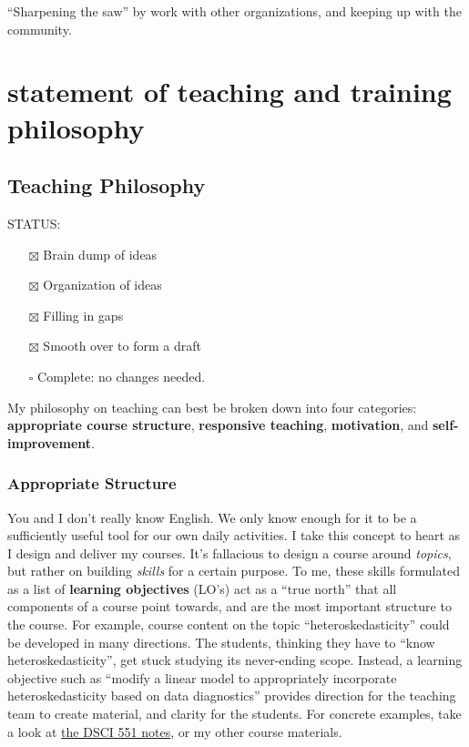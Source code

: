 \documentclass[]{article}
\providecommand{\tightlist}{%
  \setlength{\itemsep}{0pt}\setlength{\parskip}{0pt}}
\begin{document}
``Sharpening the saw'' by work with other organizations, and keeping up with the community.

\hypertarget{statement-of-teaching-and-training-philosophy}{%
\section{statement of teaching and training philosophy}\label{statement-of-teaching-and-training-philosophy}}

\hypertarget{teaching-philosophy}{%
\subsection{Teaching Philosophy}\label{teaching-philosophy}}

STATUS:

\begin{itemize}
\tightlist
\item[$\boxtimes$]
  Brain dump of ideas
\item[$\boxtimes$]
  Organization of ideas
\item[$\boxtimes$]
  Filling in gaps
\item[$\boxtimes$]
  Smooth over to form a draft
\item[$\square$]
  Complete: no changes needed.
\end{itemize}

My philosophy on teaching can best be broken down into four categories: \textbf{appropriate course structure}, \textbf{responsive teaching}, \textbf{motivation}, and \textbf{self-improvement}.

\hypertarget{appropriate-structure}{%
\subsubsection{Appropriate Structure}\label{appropriate-structure}}

You and I don't really know English. We only know enough for it to be a sufficiently useful tool for our own daily activities. I take this concept to heart as I design and deliver my courses. It's fallacious to design a course around \emph{topics}, but rather on building \emph{skills} for a certain purpose. To me, these skills formulated as a list of \textbf{learning objectives} (LO's) act as a ``true north'' that all components of a course point towards, and are the most important structure to the course. For example, course content on the topic ``heteroskedasticity'' could be developed in many directions. The students, thinking they have to ``know heteroskedasticity'', get stuck studying its never-ending scope. Instead, a learning objective such as ``modify a linear model to appropriately incorporate heteroskedasticity based on data diagnostics'' provides direction for the teaching team to create material, and clarity for the students. For concrete examples, take a look at \href{https://ubc-mds.github.io/DSCI_551_stat-prob-dsci/lectures/}{the DSCI 551 notes}, or my other course materials.
\end{document}
